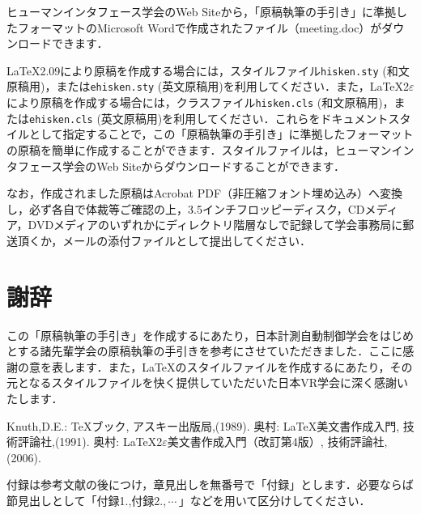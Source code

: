 \documentclass{hisken}
\begin{document}
ヒューマンインタフェース学会のWeb Siteから，「原稿執筆の手引き」に準拠したフォーマットのMicrosoft Wordで作成されたファイル（meeting.doc）がダウンロードできます．

\LaTeX2.09{}\cite{tex1,tex2}により原稿を作成する場合には，スタイルファイル{\tt hisken.sty} (和文原稿用)，または{\tt ehisken.sty} (英文原稿用)を利用してください．また，\LaTeX{}2$\varepsilon$\cite{tex3}により原稿を作成する場合には，クラスファイル{\tt hisken.cls} (和文原稿用)，または{\tt ehisken.cls} (英文原稿用)を利用してください．これらをドキュメントスタイルとして指定することで，この「原稿執筆の手引き」に準拠したフォーマットの原稿を簡単に作成することができます．スタイルファイルは，ヒューマンインタフェース学会のWeb Siteからダウンロードすることができます．

なお，作成されました原稿はAcrobat PDF（非圧縮フォント埋め込み）へ変換し，必ず各自で体裁等ご確認の上，3.5インチフロッピーディスク，CDメディア，DVDメディアのいずれかにディレクトリ階層なしで記録して学会事務局に郵送頂くか，メールの添付ファイルとして提出してください．


\section*{謝辞}
この「原稿執筆の手引き」を作成するにあたり，日本計測自動制御学会をはじめとする諸先輩学会の原稿執筆の手引きを参考にさせていただきました．ここに感謝の意を表します．また，\LaTeX{}のスタイルファイルを作成するにあたり，その元となるスタイルファイルを快く提供していただいた日本VR学会に深く感謝いたします．

\begin{thebibliography}{99}
	Knuth,D.E.:
	\TeX{}ブック,
	アスキー出版局,(1989).
	奥村:
	\LaTeX{}美文書作成入門,
	技術評論社,(1991).
    奥村:
    \LaTeX2$\varepsilon$美文書作成入門（改訂第4版）,
    技術評論社,(2006).
\end{thebibliography}


\appendix{}
付録は参考文献の後につけ，章見出しを無番号で「付録」とします．必要ならば節見出しとして「付録1.,付録2.,\,$ \cdots $\,」などを用いて区分けしてください．
\end{document}
